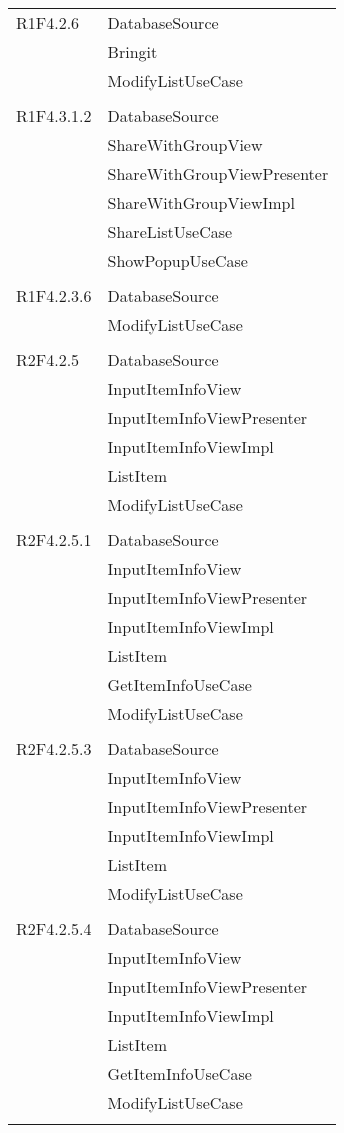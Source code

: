 \begin{center}
\begin{longtable}{|p{7cm}|p{7cm}|}
		R1F4.2.6 & DatabaseSource \\ & Bringit \\ & ModifyListUseCase \\ & \\ \hline
		R1F4.3.1.2 & DatabaseSource \\ & ShareWithGroupView \\ & ShareWithGroupViewPresenter \\ & ShareWithGroupViewImpl \\ & ShareListUseCase \\ & ShowPopupUseCase \\ & \\ \hline
		R1F4.2.3.6 & DatabaseSource \\ & ModifyListUseCase \\ & \\ \hline
		R2F4.2.5 & DatabaseSource \\ & InputItemInfoView \\ & InputItemInfoViewPresenter \\ & InputItemInfoViewImpl \\ & ListItem \\ & ModifyListUseCase \\ & \\ \hline
		R2F4.2.5.1 & DatabaseSource \\ & InputItemInfoView \\ & InputItemInfoViewPresenter \\ & InputItemInfoViewImpl \\ & ListItem \\ & GetItemInfoUseCase \\ & ModifyListUseCase \\ & \\ \hline
		R2F4.2.5.3 & DatabaseSource \\ & InputItemInfoView \\ & InputItemInfoViewPresenter \\ & InputItemInfoViewImpl \\ & ListItem \\ & ModifyListUseCase \\ & \\ \hline
		R2F4.2.5.4 & DatabaseSource \\ & InputItemInfoView \\ & InputItemInfoViewPresenter \\ & InputItemInfoViewImpl \\ & ListItem \\ & GetItemInfoUseCase \\ & ModifyListUseCase \\ & \\ \hline

\end{longtable}
\end{center}
